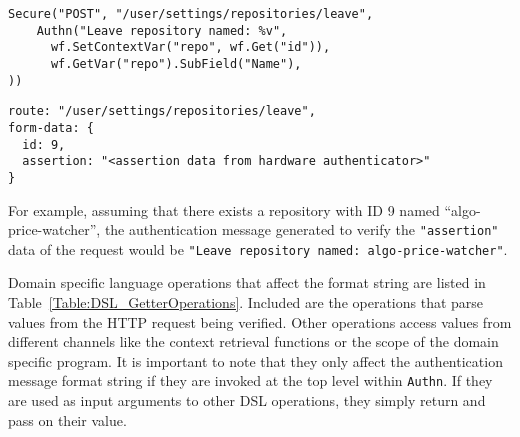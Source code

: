 \begin{lstlisting}[float=h,label=code:DSLleaveRepository,caption=A domain specific program to secure the leave Gogs repository operation.]
Secure("POST", "/user/settings/repositories/leave", 
    Authn("Leave repository named: %v",
      wf.SetContextVar("repo", wf.Get("id")),
      wf.GetVar("repo").SubField("Name"),
))
\end{lstlisting}

\begin{lstlisting}[float=h,label=code:leaveRepositoryRequest,caption=A sample HTTP request to leave the repository with ID 9.] 
route: "/user/settings/repositories/leave",
form-data: {
  id: 9,
  assertion: "<assertion data from hardware authenticator>"
}
\end{lstlisting}

For example, assuming that there exists a repository with ID 9 named ``algo-price-watcher'', the authentication message generated to verify the \lstinline{"assertion"} data of the request would be \lstinline{"Leave repository named: algo-price-watcher"}.

Domain specific language operations that affect the format string are listed in Table~\ref{Table:DSL_GetterOperations}. Included are the operations that parse values from the HTTP request being verified. Other operations access values from different channels like the context retrieval functions or the scope of the domain specific program. It is important to note that they only affect the authentication message format string if they are invoked at the top level within \lstinline{Authn}. If they are used as input arguments to other DSL operations, they simply return and pass on their value.


